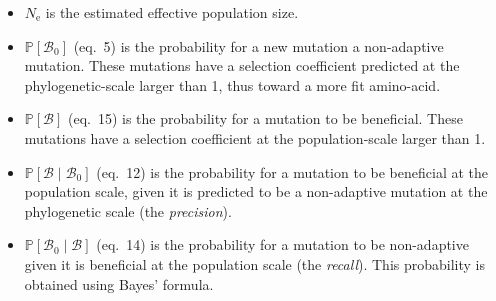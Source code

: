 \documentclass{article}
\newcommand{\Ne}{N_{\text{e}}}
\newcommand{\proba}{\mathbb{P}}
\newcommand{\SphyBen}{\mathcal{B}_0}
\newcommand{\given}{\mid}
\newcommand{\SpopBen}{\mathcal{B}}
\begin{document}
    \begin{itemize}
        \item $\Ne$ is the estimated effective population size.
        \item $\proba [ \SphyBen ]$ (eq.~5) is the probability for a new mutation a non-adaptive mutation.
        These mutations have a selection coefficient predicted at the phylogenetic-scale larger than 1, thus toward a more fit amino-acid.
        \item $\proba [ \SpopBen ]$ (eq.~15) is the probability for a mutation to be beneficial.
        These mutations have a selection coefficient at the population-scale larger than 1.
        \item $\proba [ \SpopBen \given \SphyBen]$ (eq.~12) is the probability for a mutation to be beneficial at the population scale, given it is predicted to be a non-adaptive mutation at the phylogenetic scale (the \textit{precision}).
        \item $\proba [ \SphyBen \given \SpopBen]$ (eq.~14) is the probability for a mutation to be non-adaptive given it is beneficial at the population scale (the \textit{recall}).
        This probability is obtained using Bayes' formula.
    \end{itemize}
    \newpage
\end{document}
